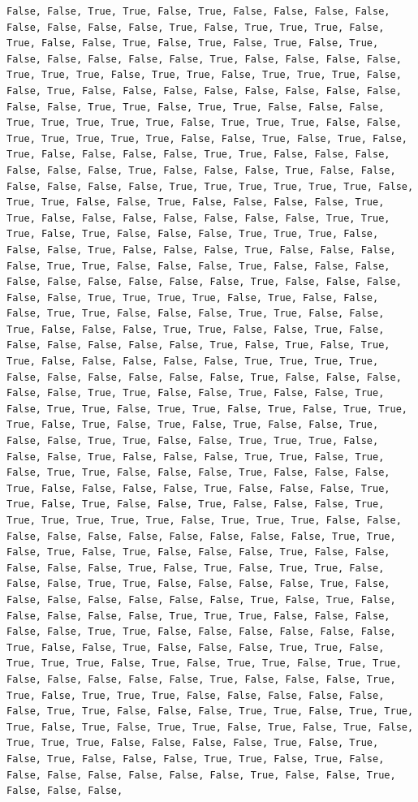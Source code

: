\documentclass[
  letterpaper,
  DIV=11,
  numbers=noendperiod]{scrartcl}
\begin{document}
\begin{verbatim}
False, False, True, True, False, True, False, False, False, False, False, False, False, False, True, False, True, True, True, False, True, False, False, True, False, True, False, True, False, True, False, False, False, False, False, True, False, False, False, False, True, True, True, False, True, True, False, True, True, True, False, False, True, False, False, False, False, False, False, False, False, False, False, True, True, False, True, True, False, False, False, True, True, True, True, True, False, True, True, True, False, False, True, True, True, True, True, False, False, True, False, True, False, True, False, False, False, False, True, True, False, False, False, False, False, False, True, False, False, False, True, False, False, False, False, False, False, True, True, True, True, True, True, False, True, True, False, False, True, False, False, False, False, True, True, False, False, False, False, False, False, False, True, True, True, False, True, False, False, False, True, True, True, False, False, False, True, False, False, False, True, False, False, False, False, True, True, False, False, False, True, False, False, False, False, False, False, False, False, False, True, False, False, False, False, False, True, True, True, True, False, True, False, False, False, True, True, False, False, False, True, True, False, False, True, False, False, False, True, True, False, False, True, False, False, False, False, False, False, True, False, True, False, True, True, False, False, False, False, False, True, True, True, True, False, False, False, False, False, False, True, False, False, False, False, False, True, True, False, False, True, False, False, True, False, True, True, False, True, True, False, True, False, True, True, True, False, True, False, True, False, True, False, False, True, False, False, True, True, False, False, True, True, True, False, False, False, True, False, False, False, True, True, False, True, False, True, True, False, False, False, True, False, False, False, True, False, False, False, False, True, False, False, False, True, True, False, True, False, False, True, False, False, False, True, True, True, True, True, True, False, True, True, True, False, False, False, False, False, False, False, False, False, False, True, True, False, True, False, True, False, False, False, True, False, False, False, False, False, True, False, True, False, True, True, False, False, False, True, True, False, False, False, False, True, False, False, False, False, False, False, False, True, False, True, False, False, False, False, False, True, True, True, False, False, False, False, False, True, True, False, False, False, False, False, False, True, False, False, True, False, False, False, True, True, False, True, True, True, False, True, False, True, True, False, True, True, False, False, False, False, False, True, False, False, False, True, True, False, True, True, True, False, False, False, False, False, False, True, True, False, False, False, True, True, False, True, True, True, False, True, False, True, True, False, True, False, True, False, True, True, True, False, False, False, False, True, False, True, False, True, False, False, False, True, True, False, True, False, False, False, False, False, False, False, True, False, False, True, False, False, False, 
\end{verbatim}
\end{document}
